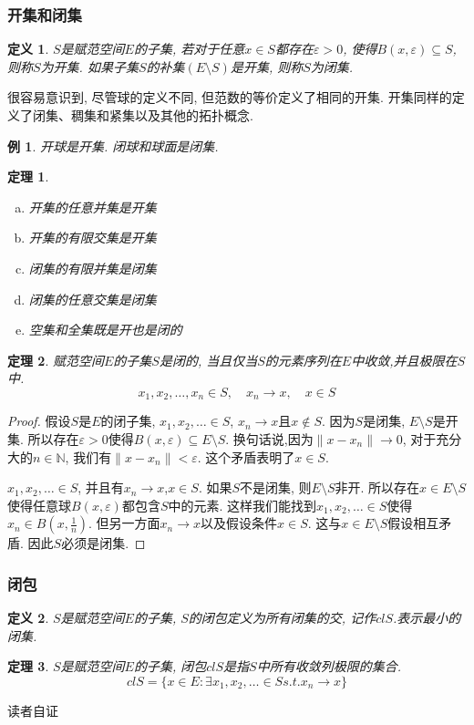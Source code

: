 \documentclass[a4paper,11pt]{book}
\newtheorem{definition}{\hspace{2em}定义}[section]
\newtheorem{theorem}{\hspace{2em}定理}[section]
\newtheorem{proof}{证明}[section]
\newtheorem{example}{例}[section]
\begin{document}
\subsubsection*{开集和闭集}
\begin{definition}
  $S$是赋范空间$E$的子集, 若对于任意$x\in S$都存在$\varepsilon>0$, 使得$B(x,\varepsilon)\subseteq S$,则称$S$为开集. 如果子集$S$的补集$(E\setminus S)$是开集, 则称$S$为闭集.
\end{definition}
很容易意识到, 尽管球的定义不同, 但范数的等价定义了相同的开集. 开集同样的定义了闭集、稠集和紧集以及其他的拓扑概念.
\begin{example}
  开球是开集. 闭球和球面是闭集.
\end{example}
\begin{theorem}\quad
\begin{enumerate}[(a)]
  \item 开集的任意并集是开集
  \item 开集的有限交集是开集
  \item 闭集的有限并集是闭集
  \item 闭集的任意交集是闭集
  \item 空集和全集既是开也是闭的
\end{enumerate}
\end{theorem}
\begin{theorem}
  赋范空间$E$的子集$S$是闭的, 当且仅当$S$的元素序列在$E$中收敛,并且极限在$S$中.
  \begin{equation*}
    x_1,x_2,\dots,x_n\in S,\quad x_n\to x,\quad x\in S
  \end{equation*}
\end{theorem}
\begin{proof}
  假设$S$是$E$的闭子集, $x_1,x_2,\dots\in S$, $x_n\to x$且$x\notin S$. 因为$S$是闭集, $E\setminus S$是开集. 所以存在$\varepsilon>0$使得$B(x,\varepsilon)\subseteq E\setminus S$. 换句话说,因为$\|x-x_n\|\to 0$, 对于充分大的$n\in \mathbb{N}$, 我们有$\|x-x_n\|<\varepsilon$. 这个矛盾表明了$x\in S$.

  $x_1,x_2,\dots\in S$, 并且有$x_n\to x$,$x\in S$. 如果$S$不是闭集, 则$E\setminus S$非开. 所以存在$x\in E\setminus S$使得任意球$B(x,\varepsilon)$都包含$S$中的元素. 这样我们能找到$x_1,x_2,\dots\in S$使得$x_n\in B(x,\frac{1}{n})$. 但另一方面$x_n\to x$以及假设条件$x\in S$. 这与$x\in E\setminus S$假设相互矛盾. 因此$S$必须是闭集.
\end{proof}
\subsubsection*{闭包}
\begin{definition}
  $S$是赋范空间$E$的子集, $S$的闭包定义为所有闭集的交, 记作$cl S$.表示最小的闭集.
\end{definition}
\begin{theorem}
  $S$是赋范空间$E$的子集, 闭包$cl S$是指$S$中所有收敛列极限的集合.
  \begin{equation*}
    cl S=\{x\in E:\exists x_1,x_2,\dots\in S s.t. x_n\to x\}
  \end{equation*}
\end{theorem}
读者自证
\end{document}
